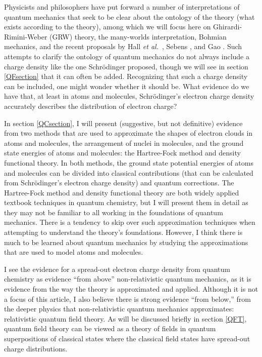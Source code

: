 \documentclass[onecolumn,secnumarabic,amsmath,amssymb,balancelastpage,nofootinbib]{article}
\begin{document}
Physicists and philosophers have put forward a number of interpretations of quantum mechanics that seek to be clear about the ontology of the theory (what exists according to the theory), among which we will focus here on Ghirardi-Rimini-Weber (GRW) theory, the many-worlds interpretation, Bohmian mechanics, and the recent proposals by Hall \emph{et al.}\ \cite{HDW}, Sebens \cite{sebens2015}, and Gao \cite{gao2014, gao2017, gao2018, gao2020}.  Such attempts to clarify the ontology of quantum mechanics do not always include a charge density like the one Schr\"{o}dinger proposed, though we will see in section \ref{QFsection} that it can often be added.  Recognizing that such a charge density can be included, one might wonder whether it should be.  What evidence do we have that, at least in atoms and molecules, Schr\"{o}dinger's electron charge density accurately describes the distribution of electron charge?

In section \ref{QCsection}, I will present (suggestive, but not definitive) evidence from two methods that are used to approximate the shapes of electron clouds in atoms and molecules, the arrangement of nuclei in molecules, and the ground state energies of atoms and molecules: the Hartree-Fock method and density functional theory.  In both methods, the ground state potential energies of atoms and molecules can be divided into classical contributions (that can be calculated from Schr\"{o}dinger's electron charge density) and quantum corrections.  The Hartree-Fock method and density functional theory are both widely applied textbook techniques in quantum chemistry, but I will present them in detail as they may not be familiar to all working in the foundations of quantum mechanics.  There is a tendency to skip over such approximation techniques when attempting to understand the theory's foundations.  However, I think there is much to be learned about quantum mechanics by studying the approximations that are used to model atoms and molecules.

I see the evidence for a spread-out electron charge density from quantum chemistry as evidence ``from above'' non-relativistic quantum mechanics, as it is evidence from the way the theory is approximated and applied.  Although it is not a focus of this article, I also believe there is strong evidence ``from below,'' from the deeper physics that non-relativistic quantum mechanics approximates: relativistic quantum field theory.  As will be discussed briefly in section \ref{QFT}, quantum field theory can be viewed as a theory of fields in quantum superpositions of classical states where the classical field states have spread-out charge distributions.
\end{document}
